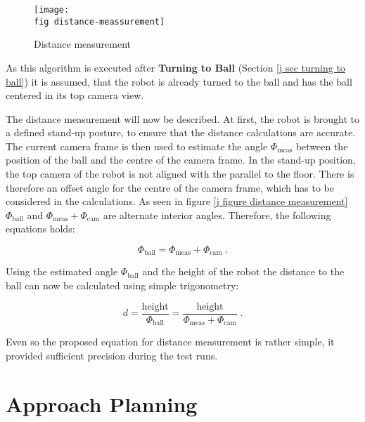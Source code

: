 \begin{figure}[ht]
  \texttt{[image: \\fig distance-meassurement]}
  \caption{Distance measurement}
  \label{j figure distance measurement}
\end{figure}

As this algorithm is executed after \textbf{Turning to Ball} (Section \ref{j
  sec turning to ball}) it is assumed, that the robot is already turned to the
ball and has the ball centered in its top camera view.

The distance measurement will now be described. At first,
the robot is brought to a defined stand-up posture, to ensure that the
distance calculations are accurate. The current camera frame is then
used to estimate the angle $\Phi_{\mathrm{meas}}$ between the position of the
ball and the centre of the camera frame. In the stand-up position, the top
camera of the robot is not aligned with the parallel to the floor. There is
therefore an offset angle for the centre of the camera frame, which has to be
considered in the calculations. As seen in figure \ref{j figure distance
  measurement} $ \Phi_{\mathrm{ball}} $ and $
\Phi_{\mathrm{meas}}+\Phi_{\mathrm{cam}} $ are alternate interior angles.
Therefore, the following equations holds:

\begin{equation}
  \Phi_{\mathrm{ball}} = \Phi_{\mathrm{meas}}+\Phi_{\mathrm{cam}} \; .
\end{equation}

Using the estimated angle $ \Phi_{\mathrm{ball}} $ and the height of the robot
the distance to the ball can now be calculated using simple trigonometry:

\begin{equation}
  d = \frac{\mathrm{height}}{\Phi_{\mathrm{ball}}} = \frac{\mathrm{height}}{\Phi_{\mathrm{meas}}+\Phi_{\mathrm{cam}}} \; .
\end{equation}

Even so the proposed equation for distance measurement is rather simple, it
provided sufficient precision during the test runs.


\section{Approach Planning}
\label{j sec approach planning}

